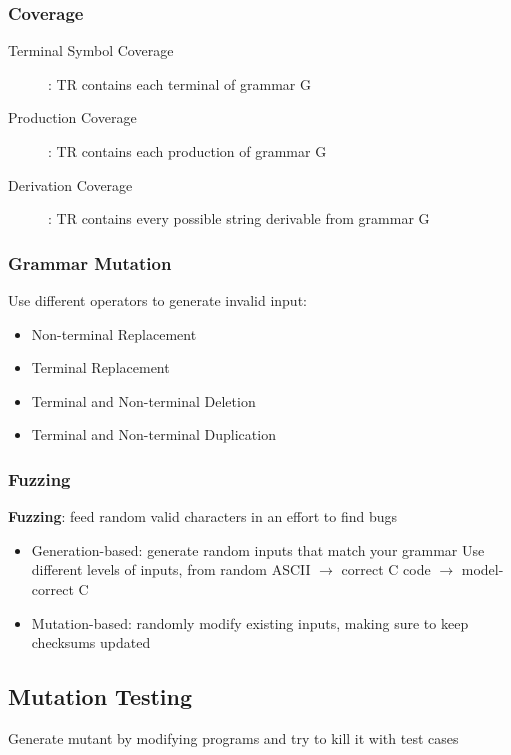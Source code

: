 \documentclass[]{article}
\theoremstyle{definition}
\begin{document}
			\subsubsection{Coverage}
				\begin{description}
					\item[Terminal Symbol Coverage]: TR contains each terminal of grammar G
					\item[Production Coverage]: TR contains each production of grammar G
					\item[Derivation Coverage]: TR contains every possible string derivable from grammar G
				\end{description}
				\subsubsection{Grammar Mutation}
					Use different operators to generate invalid input:
					\begin{itemize}
						\item Non-terminal Replacement
						\item Terminal Replacement
						\item Terminal and Non-terminal Deletion
						\item Terminal and Non-terminal Duplication
					\end{itemize}
				\subsubsection{Fuzzing}
					\textbf{Fuzzing}: feed random valid characters in an effort to find bugs 

					\begin{itemize}
						\item Generation-based: generate random inputs that match your grammar
							Use different levels of inputs, from random ASCII $\rightarrow$ correct C code $\rightarrow$ model-correct C
						\item Mutation-based: randomly modify existing inputs, making sure to keep checksums updated
					\end{itemize}
			\subsection{Mutation Testing}
				Generate mutant by modifying programs and try to kill it with test cases 
\end{document}
